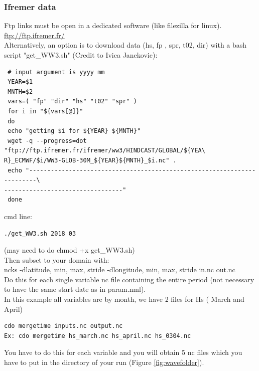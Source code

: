 \documentclass[preprints,briefreport,accept,oneauthor,pdftex]{Definitions/mdpi}
\begin{document}
\subsubsection{Ifremer data}
\noindent Ftp links must be open in a dedicated software (like filezilla for linux).\\ \url{ftp://ftp.ifremer.fr/}\\
Alternatively, an option is to download data (hs, fp , spr, t02, dir) with a bash script "get\_WW3.sh" (Credit to Ivica Janekovic):
\begin{lstlisting}
 # input argument is yyyy mm                                                    
 YEAR=$1
 MNTH=$2
 vars=( "fp" "dir" "hs" "t02" "spr" )
 for i in "${vars[@]}"
 do
 echo "getting $i for ${YEAR} ${MNTH}"
 wget -q --progress=dot "ftp://ftp.ifremer.fr/ifremer/ww3/HINDCAST/GLOBAL/${YEA\
R}_ECMWF/$i/WW3-GLOB-30M_${YEAR}${MNTH}_$i.nc" .
 echo "------------------------------------------------------------------------\
---------------------------------"
 done
\end{lstlisting}
cmd line:
\begin{lstlisting}
./get_WW3.sh 2018 03
\end{lstlisting}
(may need to do chmod +x get\_WW3.sh)\\
\noindent Then subset to your domain with:\\
ncks -dlatitude, min, max, stride -dlongitude, min, max, stride in.nc out.nc \\
Do this for each single variable nc file containing the entire period (not necessary to have the same start date as in param.nml).\\
In this example all variables are by month,  we have 2 files for Hs ( March and April)
\begin{lstlisting}
cdo mergetime inputs.nc output.nc
Ex: cdo mergetime hs_march.nc hs_april.nc hs_0304.nc
\end{lstlisting}
You have to do this for each variable and you will obtain 5 nc files which you have to put in the directory of your run (Figure \ref{fig:wavefolder}).
\end{document}
